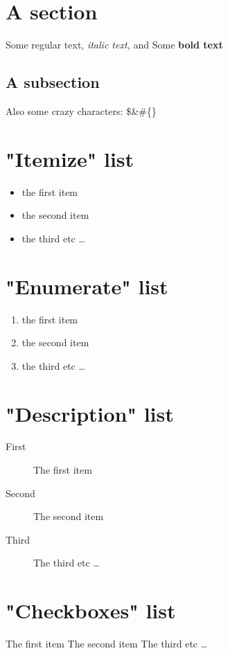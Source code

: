 \documentclass[french,answers,addpoints,12pt]{exam}%
\begin{document}
%
\normalsize%
\section{A section}%
\label{sec:A section}%
Some regular text, %
\textit{italic text, }%
and Some %
\textbf{bold text}%
\subsection{A subsection}%
\label{subsec:A subsection}%
Also some crazy characters: \$\&\#\{\}

%
\section{"Itemize" list}%
\label{sec:Itemize list}%
\begin{itemize}%
\item%
the first item%
\item%
the second item%
\item%
the third etc%
\ldots%
\end{itemize}

%
\section{"Enumerate" list}%
\label{sec:Enumerate list}%
\begin{enumerate}[label=\alph*),start=20]%
\item%
the first item%
\item%
the second item%
\item%
the third etc \ldots%
\end{enumerate}

%
\section{"Description" list}%
\label{sec:Description list}%
\begin{description}%
\item[First]%
The first item%
\item[Second]%
The second item%
\item[Third]%
The third etc \ldots%
\end{description}

%
\section{"Checkboxes" list}%
\label{sec:Checkboxes list}%
\begin{checkboxes}%
\choice%
The first item%
\CorrectChoice%
The second item%
\choice%
The third etc \ldots%
\end{checkboxes}

%
\end{document}
